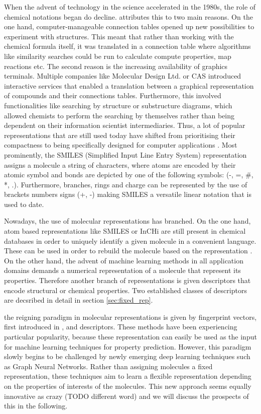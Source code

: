 When the advent of technology in the science accelerated in the 1980s, the role of chemical notations began do decline. \citep{Lawlor} attributes this to two main reasons. On the one hand, computer-manageable connection tables opened up new possibilities to experiment with structures. This meant that rather than working with the chemical formula itself, it was translated in a connection table where algorithms like similarity searches could be run to calculate compute properties, map reactions etc. 
The second reason is the increasing availability of graphics terminals. Multiple companies like Molecular Design Ltd. or CAS \citep{cas} introduced interactive services that enabled a translation between a graphical representation of compounds and their connections tables. Furthermore, this involved functionalities like searching by structure or substructure diagrams, which allowed chemists to perform the searching by themselves rather than being dependent on their information scientist intermediaries. Thus, a lot of popular representations that are still used today have shifted from prioritising their compactness to being specifically designed for computer applications \citep{smiles, heller2015inchi, cereto2015molecular}. Most prominently, the SMILES (Simplified Input Line Entry System) representation \citep{smiles} assigns a molecule a string of characters, where atoms are encoded by their atomic symbol and bonds are depicted by one of the following symbols: (-, =, \#, *, .). Furthermore, branches, rings and charge can be represented by the use of brackets numbers signs (+, -) making SMILES a versatile linear notation that is used to date. 

Nowadays, the use of molecular representations has branched. On the one hand, atom based representations like SMILES or InCHi are still present in chemical databases in order to uniquely identify a given molecule in a convenient language. These can be used in order to rebuild the molecule based on the representation \cite{molrep}. On the other hand, the advent of machine learning methods in all application domains demands a numerical representation of a molecule that represent its properties. Therefore another branch of representations is given descriptors that encode structural or chemical properties. Two established classes of descriptors are decsribed in detail  in section \ref{sec:fixed_rep}. 

 the reigning paradigm in molecular representations is given by fingerprint vectors, first introduced in , and descriptors. These methods have been experiencing particular popularity, because these representation can easily be used as the input for machine learning techniques for property prediction. However, this paradigm slowly begins to be challenged by newly emerging deep learning techniques such as Graph Neural Networks.
Rather than assigning molecules a fixed representation, these techniques aim to learn a flexible representation depending on the properties of interests of the molecules. This new approach seems equally innovative as crazy (TODO different word) and we will discuss the prospects of this in the following. 

